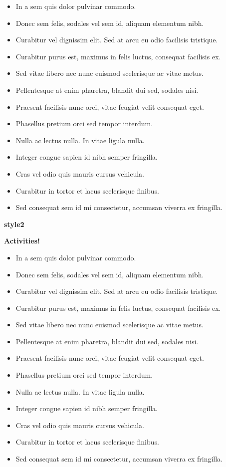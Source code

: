\documentclass[
]{book}
\begin{document}
\begin{itemize}
\item
  In a sem quis dolor pulvinar commodo.
\item
  Donec sem felis, sodales vel sem id, aliquam elementum nibh.
\item
  Curabitur vel dignissim elit. Sed at arcu eu odio facilisis tristique.
\item
  Curabitur purus est, maximus in felis luctus, consequat facilisis ex.
\item
  Sed vitae libero nec nunc euismod scelerisque ac vitae metus.
\item
  Pellentesque at enim pharetra, blandit dui sed, sodales nisi.
\item
  Praesent facilisis nunc orci, vitae feugiat velit consequat eget.
\item
  Phasellus pretium orci sed tempor interdum.
\item
  Nulla ac lectus nulla. In vitae ligula nulla.
\item
  Integer congue sapien id nibh semper fringilla.
\item
  Cras vel odio quis mauris cursus vehicula.
\item
  Curabitur in tortor et lacus scelerisque finibus.
\item
  Sed consequat sem id mi consectetur, accumsan viverra ex fringilla.
\end{itemize}

\textbf{style2}

\textbf{Activities!}

\begin{itemize}
\item
  In a sem quis dolor pulvinar commodo.
\item
  Donec sem felis, sodales vel sem id, aliquam elementum nibh.
\item
  Curabitur vel dignissim elit. Sed at arcu eu odio facilisis tristique.
\item
  Curabitur purus est, maximus in felis luctus, consequat facilisis ex.
\item
  Sed vitae libero nec nunc euismod scelerisque ac vitae metus.
\item
  Pellentesque at enim pharetra, blandit dui sed, sodales nisi.
\item
  Praesent facilisis nunc orci, vitae feugiat velit consequat eget.
\item
  Phasellus pretium orci sed tempor interdum.
\item
  Nulla ac lectus nulla. In vitae ligula nulla.
\item
  Integer congue sapien id nibh semper fringilla.
\item
  Cras vel odio quis mauris cursus vehicula.
\item
  Curabitur in tortor et lacus scelerisque finibus.
\item
  Sed consequat sem id mi consectetur, accumsan viverra ex fringilla.
\end{itemize}
\end{document}
